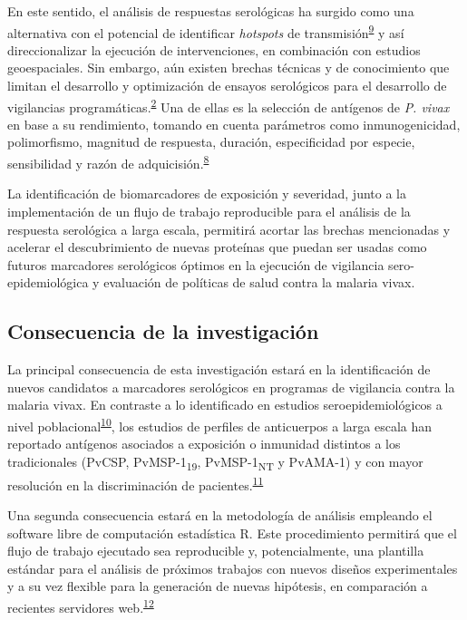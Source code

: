 \documentclass[]{article}
\begin{document}
En este sentido, el análisis de respuestas serológicas ha surgido como
una alternativa con el potencial de identificar \emph{hotspots} de
transmisión\textsuperscript{\protect\hyperlink{ref-hotspots2015}{9}} y
así direccionalizar la ejecución de intervenciones, en combinación con
estudios geoespaciales. Sin embargo, aún existen brechas técnicas y de
conocimiento que limitan el desarrollo y optimización de ensayos
serológicos para el desarrollo de vigilancias
programáticas.\textsuperscript{\protect\hyperlink{ref-rosas2016peru}{2}}
Una de ellas es la selección de antígenos de \emph{P. vivax} en base a
su rendimiento, tomando en cuenta parámetros como inmunogenicidad,
polimorfismo, magnitud de respuesta, duración, especificidad por
especie, sensibilidad y razón de
adquicisión.\textsuperscript{\protect\hyperlink{ref-elliott2014}{8}}

La identificación de biomarcadores de exposición y severidad, junto a la
implementación de un flujo de trabajo reproducible para el análisis de
la respuesta serológica a larga escala, permitirá acortar las brechas
mencionadas y acelerar el descubrimiento de nuevas proteínas que puedan
ser usadas como futuros marcadores serológicos óptimos en la ejecución
de vigilancia sero-epidemiológica y evaluación de políticas de salud
contra la malaria vivax.

\subsection{Consecuencia de la investigación}\label{consec}

La principal consecuencia de esta investigación estará en la
identificación de nuevos candidatos a marcadores serológicos en
programas de vigilancia contra la malaria vivax. En contraste a lo
identificado en estudios seroepidemiológicos a nivel
poblacional\textsuperscript{\protect\hyperlink{ref-cutts2014meta}{10}},
los estudios de perfiles de anticuerpos a larga escala han reportado
antígenos asociados a exposición o inmunidad distintos a los
tradicionales (PvCSP, PvMSP-1\textsubscript{19},
PvMSP-1\textsubscript{NT} y PvAMA-1) y con mayor resolución en la
discriminación de
pacientes.\textsuperscript{\protect\hyperlink{ref-crompton2010}{11}}

Una segunda consecuencia estará en la metodología de análisis empleando
el software libre de computación estadística R. Este procedimiento
permitirá que el flujo de trabajo ejecutado sea reproducible y,
potencialmente, una plantilla estándar para el análisis de próximos
trabajos con nuevos diseños experimentales y a su vez flexible para la
generación de nuevas hipótesis, en comparación a recientes servidores
web.\textsuperscript{\protect\hyperlink{ref-gmine2016}{12}}
\end{document}
